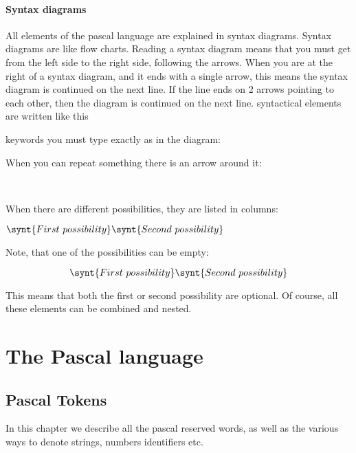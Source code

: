 \documentclass{report}
\begin{document}
\subsection{Syntax diagrams}
All elements of the pascal language are explained in syntax diagrams.
Syntax diagrams are like flow charts. Reading a syntax diagram means that
you must get from the left side to the right side, following the arrows.
When you are at the right of a syntax diagram, and it ends with a single
arrow, this means the syntax diagram is continued on the next line. If
the line ends on 2 arrows pointing to each other, then the diagram is
continued on the next line.
syntactical elements are written like this
\begin{mysyntdiag}
\end{mysyntdiag}
keywords you must type exactly as in the diagram:
\begin{mysyntdiag}
\end{mysyntdiag}
When you can repeat something there is an arrow around it:
\begin{mysyntdiag}
\<[b]  \\ \>
\end{mysyntdiag}
When there are different possibilities, they are listed in columns:
\begin{mysyntdiag}
\(
\synt{First\ possibility} \\
\synt{Second\ possibility}
\)
\end{mysyntdiag}
Note, that one of the possibilities can be empty:
\begin{mysyntdiag}
\[
\synt{First\ possibility} \\
\synt{Second\ possibility}
\]
\end{mysyntdiag}
This means that both the first or second possibility are optional.
Of course, all these elements can be combined and nested.
\part{The Pascal language}
%
%
\chapter{Pascal Tokens}
In this chapter we describe all the pascal reserved words, as well as the
various ways to denote strings, numbers identifiers etc.
\end{document}

